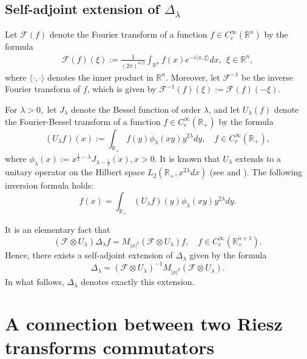 \documentclass[12pt]{amsart}
\begin{document}
\subsection{Self-adjoint extension of $\Delta_\lambda$}\label{Selfexten}

Let $\mathcal{F}(f)$ denote the Fourier transform of a function $f\in C_c^\infty(\mathbb{R}^n)$ by the formula
\begin{align*}
\mathcal{F}(f)(\xi):=\frac{1}{(2\pi)^{n/2}}\int_{\mathbb{R}^{n}}f(x)e^{-i\langle x,\xi \rangle}dx, \ \ \xi\in\mathbb{R}^{n},
\end{align*}
where $\langle \cdot,\cdot \rangle$ denotes the inner product in $\mathbb{R}^n$.
Moreover, let $\mathcal{F}^{-1}$ be the inverse Fourier transform of $f$, which is given by $\mathcal{F}^{-1}(f)(\xi):=\mathcal{F}(f)(-\xi)$.

For $\lambda>0,$ let $J_\lambda$ denote the Bessel function of order $\lambda$, and let $U_{\lambda}(f)$ denote the Fourier-Bessel transform of a function $f\in C^{\infty}_c(\mathbb{R}_+)$ by the formula
$$(U_{\lambda}f)(x):=\int_{\mathbb{R}_+}f(y)\phi_\lambda(xy)y^{2\lambda}dy,\quad f\in C^{\infty}_c(\mathbb{R}_+),$$
where
$\phi_\lambda(x):=x^{\frac12-\lambda}J_{\lambda-\frac12}(x), x>0.$
It is known that $U_{\lambda}$ extends to a unitary operator on the Hilbert space $L_2(\mathbb{R}_+,x^{2\lambda}dx)$ (see \cite{MS} and \cite[Proposition 2.5]{MTaylor}). The following inversion formula holds:
$$f(x)=\int_{\mathbb{R}_+} (U_{\lambda}f)(y)\phi_{\lambda}(xy)y^{2\lambda}dy.$$


It is an elementary fact that
$$(\mathcal{F}\otimes U_{\lambda})\Delta_{\lambda}f=M_{|x|^2}(\mathcal{F}\otimes U_{\lambda})f,\quad f\in C^{\infty}_c(\mathbb{R}_+^{n+1}).$$
Hence, there exists a self-adjoint extension of $\Delta_{\lambda}$ given by the formula
$$\Delta_{\lambda}=(\mathcal{F}\otimes U_{\lambda})^{-1}M_{|x|^2}(\mathcal{F}\otimes U_{\lambda}).$$
In what follows, $\Delta_{\lambda}$ denotes exactly this extension.

\section{A connection between two Riesz transforms commutators}\label{Sec3}
\end{document}
